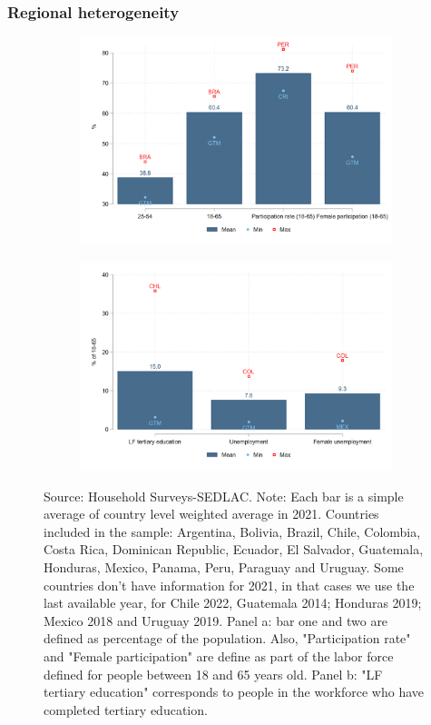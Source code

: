 \documentclass{beamer}
\begin{document}
\begin{frame}
\frametitle{Regional heterogeneity}
\begin{figure}[!htb]
\justifying
  \caption{Demographic profile and structure of labor market}
\begin{subfigure}{.9\textwidth}
  \centering
  \includegraphics[width=0.5\linewidth]{latex/figures/Snapshot/Structure of labor market_a.png}
  \label{fig:labmarket1}
\end{subfigure}

\begin{subfigure}{.9\textwidth}
  \centering
  \includegraphics[width=0.5\linewidth]{latex/figures/Snapshot/Structure of labor market_b.png}
  \label{fig:labmarket2}
\end{subfigure}

\footnotesize{Source: Household Surveys-SEDLAC.}
\footnotesize{Note: Each bar is a simple average of country level weighted average in 2021. Countries included in the sample: Argentina, Bolivia, Brazil, Chile, Colombia, Costa Rica, Dominican Republic, Ecuador, El Salvador, Guatemala, Honduras, Mexico, Panama, Peru, Paraguay and Uruguay. Some countries don’t have information for 2021, in that cases we use the last available year, for Chile 2022, Guatemala 2014; Honduras 2019; Mexico 2018 and Uruguay 2019. Panel a: bar one and two are defined as percentage of the population. Also, "Participation rate" and "Female participation" are define as part of the labor force defined for people between 18 and 65 years old. Panel b: "LF tertiary education" corresponds to people in the workforce who have completed tertiary education.}

\end{figure}

\end{frame}
\end{document}
